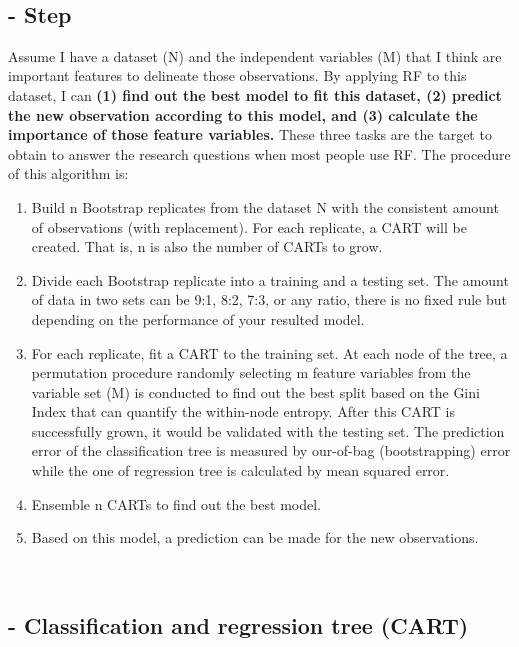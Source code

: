 \documentclass[
]{article}
\providecommand{\tightlist}{%
  \setlength{\itemsep}{0pt}\setlength{\parskip}{0pt}}
\begin{document}
~

\hypertarget{step}{%
\subsection{- Step}\label{step}}

Assume I have a dataset (N) and the independent variables (M) that I
think are important features to delineate those observations. By
applying RF to this dataset, I can \textbf{(1) find out the best model
to fit this dataset, (2) predict the new observation according to this
model, and (3) calculate the importance of those feature variables.}
These three tasks are the target to obtain to answer the research
questions when most people use RF. The procedure of this algorithm is:

\begin{enumerate}
\def\labelenumi{\arabic{enumi}.}
\tightlist
\item
  Build n Bootstrap replicates from the dataset N with the consistent
  amount of observations (with replacement). For each replicate, a CART
  will be created. That is, n is also the number of CARTs to grow.
\item
  Divide each Bootstrap replicate into a training and a testing set. The
  amount of data in two sets can be 9:1, 8:2, 7:3, or any ratio, there
  is no fixed rule but depending on the performance of your resulted
  model.
\item
  For each replicate, fit a CART to the training set. At each node of
  the tree, a permutation procedure randomly selecting m feature
  variables from the variable set (M) is conducted to find out the best
  split based on the Gini Index that can quantify the within-node
  entropy. After this CART is successfully grown, it would be validated
  with the testing set. The prediction error of the classification tree
  is measured by our-of-bag (bootstrapping) error while the one of
  regression tree is calculated by mean squared error.
\item
  Ensemble n CARTs to find out the best model.
\item
  Based on this model, a prediction can be made for the new
  observations.
\end{enumerate}

~

\hypertarget{classification-and-regression-tree-cart}{%
\subsection{- Classification and regression tree
(CART)}\label{classification-and-regression-tree-cart}}
\end{document}
